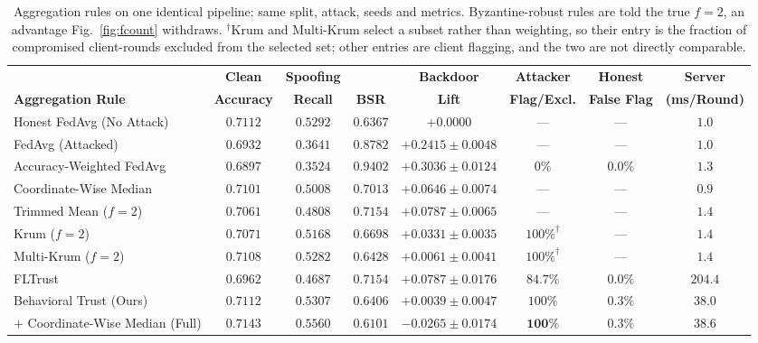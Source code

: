 \documentclass[conference]{IEEEtran}
\begin{document}
\begin{table}[!tb]
\caption{Aggregation rules on one identical pipeline: same split, attack, seeds
and metrics. Byzantine-robust rules are told the true $f{=}2$, an advantage
Fig.~\ref{fig:fcount} withdraws. $^{\dagger}$Krum and Multi-Krum select a subset
rather than weighting, so their entry is the fraction of compromised
client-rounds excluded from the selected set; other entries are client
flagging, and the two are not directly comparable.}
\label{tab:main}
\centering
\footnotesize
\setlength{\tabcolsep}{7pt}
\renewcommand{\arraystretch}{1.22}
\begin{tabular}{@{}l ccc c cc c@{}}
\toprule
 & \textbf{Clean} & \textbf{Spoofing} & & \textbf{Backdoor} & \textbf{Attacker} & \textbf{Honest} & \textbf{Server} \\
\textbf{Aggregation Rule} & \textbf{Accuracy} & \textbf{Recall} & \textbf{BSR} & \textbf{Lift} & \textbf{Flag/Excl.} & \textbf{False Flag} & \textbf{(ms/Round)} \\
\midrule
Honest FedAvg (No Attack) & $0.7112$ & $0.5292$ & $0.6367$ & $+0.0000$ & --- & --- & $1.0$ \\
\midrule
FedAvg (Attacked) & $0.6932$ & $0.3641$ & $0.8782$ & $+0.2415 \pm 0.0048$ & --- & --- & $1.0$ \\
Accuracy-Weighted FedAvg~\cite{chai2025navigation} & $0.6897$ & $0.3524$ & $0.9402$ & $+0.3036 \pm 0.0124$ & $0\%$ & $0.0\%$ & $1.3$ \\
Coordinate-Wise Median & $0.7101$ & $0.5008$ & $0.7013$ & $+0.0646 \pm 0.0074$ & --- & --- & $0.9$ \\
Trimmed Mean ($f{=}2$) & $0.7061$ & $0.4808$ & $0.7154$ & $+0.0787 \pm 0.0065$ & --- & --- & $1.4$ \\
Krum ($f{=}2$)~\cite{blanchard2017machine} & $0.7071$ & $0.5168$ & $0.6698$ & $+0.0331 \pm 0.0035$ & $100\%^{\dagger}$ & --- & $1.4$ \\
Multi-Krum ($f{=}2$)~\cite{blanchard2017machine} & $0.7108$ & $0.5282$ & $0.6428$ & $+0.0061 \pm 0.0041$ & $100\%^{\dagger}$ & --- & $1.4$ \\
FLTrust~\cite{cao2021fltrust} & $0.6962$ & $0.4687$ & $0.7154$ & $+0.0787 \pm 0.0176$ & $84.7\%$ & $0.0\%$ & $204.4$ \\
\midrule
Behavioral Trust (Ours) & $0.7112$ & $0.5307$ & $0.6406$ & $+0.0039 \pm 0.0047$ & $100\%$ & $0.3\%$ & $38.0$ \\
\;\;$+$ Coordinate-Wise Median (Full) & $\mathbf{0.7143}$ & $\mathbf{0.5560}$ & $\mathbf{0.6101}$ & $\mathbf{-0.0265 \pm 0.0174}$ & $\mathbf{100\%}$ & $\mathbf{0.3\%}$ & $38.6$ \\
\bottomrule
\end{tabular}
\end{table}
\end{document}
